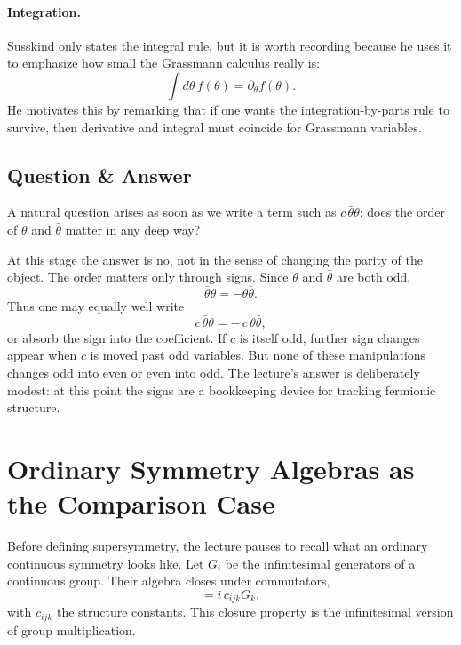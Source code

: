 \paragraph{Integration.}
Susskind only states the integral rule, but it is worth recording because he uses it to emphasize how small the Grassmann calculus really is:
\begin{equation}
\int d\theta\, f(\theta)=\partial_\theta f(\theta).
\end{equation}
He motivates this by remarking that if one wants the integration-by-parts rule to survive, then derivative and integral must coincide for Grassmann variables.

\subsection{Question \& Answer}

A natural question arises as soon as we write a term such as \(c\,\bar\theta\theta\): does the order of \(\theta\) and \(\bar\theta\) matter in any deep way?

At this stage the answer is no, not in the sense of changing the parity of the object. The order matters only through signs. Since \(\theta\) and \(\bar\theta\) are both odd,
\begin{equation}
\bar\theta\theta=-\theta\bar\theta.
\end{equation}
Thus one may equally well write
\begin{equation}
c\,\bar\theta\theta = -\,c\,\theta\bar\theta,
\end{equation}
or absorb the sign into the coefficient. If \(c\) is itself odd, further sign changes appear when \(c\) is moved past odd variables. But none of these manipulations changes odd into even or even into odd. The lecture's answer is deliberately modest: at this point the signs are a bookkeeping device for tracking fermionic structure.

\section{Ordinary Symmetry Algebras as the Comparison Case}

Before defining supersymmetry, the lecture pauses to recall what an ordinary continuous symmetry looks like. Let \(G_i\) be the infinitesimal generators of a continuous group. Their algebra closes under commutators,
\begin{equation}
[G_i,G_j]=i\,c_{ijk}G_k,
\end{equation}
with \(c_{ijk}\) the structure constants. This closure property is the infinitesimal version of group multiplication.

